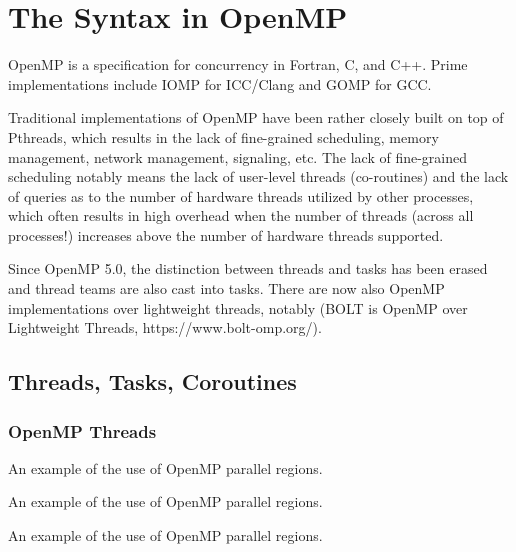 \chapter{The Syntax in OpenMP}

OpenMP is a specification for concurrency in Fortran, C, and C++. Prime implementations include IOMP for ICC/Clang and GOMP for GCC.

Traditional implementations of OpenMP have been rather closely built on top of Pthreads, 
which results in the lack of fine-grained scheduling, 
memory management, network management, signaling, etc.
The lack of fine-grained scheduling notably means the lack of user-level threads (co-routines)
and the lack of queries as to the number of hardware threads utilized by other processes, 
which often results in high overhead when the number of threads (across all processes!) increases above the number of hardware threads supported.

Since OpenMP 5.0, the distinction between threads and tasks has been erased and thread teams are also cast into tasks. There are now also OpenMP implementations over lightweight threads, notably (BOLT is OpenMP over Lightweight Threads, https://www.bolt-omp.org/). 

\section{Threads, Tasks, Coroutines}

\subsection{OpenMP Threads}

\raggedbottom
\begin{codebox}[]{\href{https://godbolt.org/z/}{\ExternalLink}}
\footnotesize An example of the use of OpenMP parallel regions.
\tcblower
{}
\end{codebox}

\raggedbottom
\begin{codebox}[]{\href{https://godbolt.org/z/}{\ExternalLink}}
\footnotesize An example of the use of OpenMP parallel regions.
\tcblower
{}
\end{codebox}

\raggedbottom
\begin{codebox}[]{\href{https://godbolt.org/z/}{\ExternalLink}}
\footnotesize An example of the use of OpenMP parallel regions.
\tcblower
{}
\end{codebox}

